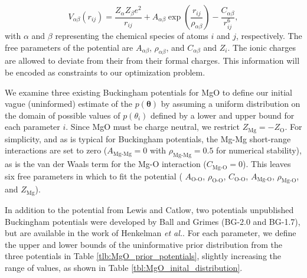 \begin{equation}
	V_{\alpha\beta}(r_{ij}) =
			\frac{Z_{\alpha}Z_{\beta}e^2}{r_{ij}}
			+ A_{\alpha\beta} \exp \left(\frac{r_{ij}}
																				{\rho_{\alpha\beta}}
															\right)
			- \frac{C_{\alpha\beta}}
			       {r_{ij}^6},
\end{equation}
with $\alpha$ and $\beta$ representing the chemical species of atoms $i$ and $j$, respectively.  The free parameters of the potential are $A_{\alpha\beta}$, $\rho_{\alpha\beta}$, and $C_{\alpha\beta}$ and $Z_i$.  The ionic charges are allowed to deviate from their from their formal charges.  This information will be encoded as constraints to our optimization problem.

We examine three existing Buckingham potentials for MgO to define our initial vague (uninformed) estimate of the $p(\bm{\theta})$ by assuming a uniform distribution on the domain of possible values of $p(\theta_i)$ defined by a lower and upper bound for each parameter $i$. Since MgO must be charge neutral, we restrict $Z_{\text{Mg}}= -Z_{\text{O}}$. For simplicity, and as is typical for Buckingham potentials, the Mg-Mg short-range interactions are set to zero ($A_\text{Mg-Mg}=0$ with $\rho_{\text{Mg-Mg}}=0.5$  for numerical stability), as is the van der Waals term for the Mg-O interaction ($C_{\text{Mg-O}}=0$). This leaves six free parameters in which to fit the potential (
$A_{\text{O-O}}$,
$\rho_{\text{O-O}}$,
$C_{\text{O-O}}$,
$A_{\text{Mg-O}}$,
$\rho_{\text{Mg-O}}$, and
$Z_{\text{Mg}}$).

In addition to the potential from Lewis and Catlow, two potentials unpublished Buckingham potentials were developed by Ball and Grimes (BG-2.0 and BG-1.7), but are available in the work of Henkelman \emph{et al.}\cite{henkelman2005_buckingham_MgO}.  For each parameter, we define the upper and lower bounds of the uninformative prior distribution from the three potentials in Table \ref{tlb:MgO_prior_potentials}, slightly increasing the range of values, as shown in Table \ref{tbl:MgO_inital_distribution}.

